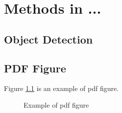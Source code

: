 \chapter{Methods in ...}

\section{Object Detection}








\section{PDF Figure}
Figure \ref{fig:example_svg} is an example of pdf figure.

\begin{figure}[H]
  \centering
  
  \caption{Example of pdf figure}
  \label{fig:example_svg}
\end{figure}
